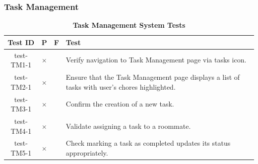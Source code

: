 \documentclass[12pt, titlepage]{article}
\begin{document}
					
					



					
					
					




\subsubsection{Task Management}

\begin{table}[H]
\centering
\begin{tabular}{|c|c|c|p{6cm}|}
\hline
Test ID & P & F & Test\\
\hline 
test-TM1-1 & $\times$ & & Verify navigation to Task Management page via tasks icon.\\
\hline 
test-TM2-1 & $\times$ & & Ensure that the Task Management page displays a list of tasks with user's chores highlighted.\\
\hline 
test-TM3-1 & $\times$ & & Confirm the creation of a new task.\\
\hline 
test-TM4-1 & $\times$ & & Validate assigning a task to a roommate.\\
\hline 
test-TM5-1 & $\times$ & & Check marking a task as completed updates its status appropriately.\\
\hline
\end{tabular}
\caption{\bf Task Management System Tests}
\end{table}
\end{document}
